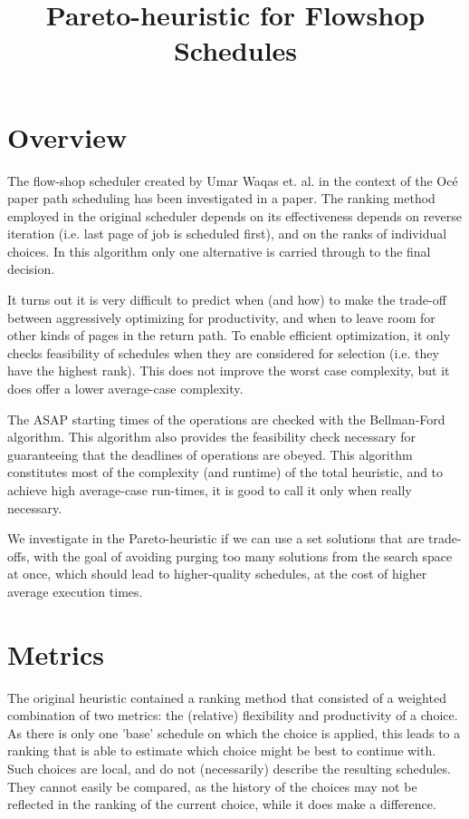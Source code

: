 \documentclass[]{article}
\title{Pareto-heuristic for Flowshop Schedules}
\author{}
\begin{document}
\date{}
\maketitle

\section{Overview}

The flow-shop scheduler created by Umar Waqas et. al. in the context of the Oc\'e paper path scheduling has been investigated in a paper. The ranking method employed in the original scheduler depends on its effectiveness depends on reverse iteration (i.e. last page of job is scheduled first), and on the ranks of individual choices. In this algorithm only one alternative is carried through to the final decision. 

It turns out it is very difficult to predict when (and how) to make the trade-off between aggressively optimizing for productivity, and when to leave room for other kinds of pages in the return path. To enable efficient optimization, it only checks feasibility of schedules when they are considered for selection (i.e. they have the highest rank). This does not improve the worst case complexity, but it does offer a lower average-case complexity.

The ASAP starting times of the operations are checked with the Bellman-Ford algorithm. This algorithm also provides the feasibility check necessary for guaranteeing that the deadlines of operations are obeyed. This algorithm constitutes most of the complexity (and runtime) of the total heuristic, and to achieve high average-case run-times, it is good to call it only when really necessary.

We investigate in the Pareto-heuristic if we can use a set solutions that are trade-offs, with the goal of avoiding purging too many solutions from the search space at once, which should lead to higher-quality schedules, at the cost of higher average execution times. 

\section{Metrics}

The original heuristic contained a ranking method that consisted of a weighted combination of two metrics: the (relative) flexibility and productivity of a choice. As there is only one 'base' schedule on which the choice is applied, this leads to a ranking that is able to estimate which choice might be best to continue with. Such choices are local, and do not (necessarily) describe the resulting schedules. They cannot easily be compared, as the history of the choices may not be reflected in the ranking of the current choice, while it does make a difference.
\end{document}
